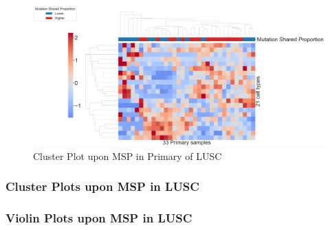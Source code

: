 \documentclass{beamer}
\begin{document}
\begin{frame}[allowframebreaks]
        \begin{figure}
            \includegraphics[width=0.9 \linewidth]{figures/BisqueRNA/clustermap/STAR.FPKM.GSE162498.SQC.MSP-median/Mutation Shared Proportion-Primary.pdf}
            \caption{Cluster Plot upon MSP in Primary of LUSC}
        \end{figure}
    \end{frame}

    \begin{frame}[allowframebreaks]
        \frametitle{Cluster Plots upon MSP in LUSC}
    \end{frame}

    \begin{frame}[allowframebreaks]
        \frametitle{Violin Plots upon MSP in LUSC}
    \end{frame}
\end{document}

